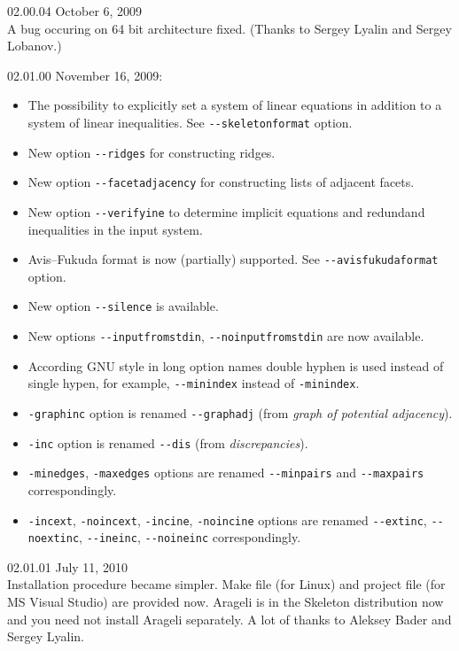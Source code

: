 \documentclass{article}
\newcommand{\Skeleton}{{\sc Skeleton}\xspace}
\newcommand{\params}{\smallskip\hangindent=2\parindent}
\newcommand{\Arageli}{{\sc Arageli}\xspace}
\begin{document}
\params \Skeleton 02.00.04 October 6, 2009\\
A bug occuring on 64 bit architecture fixed. (Thanks to Sergey Lyalin and Sergey Lobanov.)

\params \Skeleton 02.01.00 November 16, 2009:
\begin{itemize}
\item The possibility to explicitly set a system of linear equations in addition to a system of linear inequalities.
      See \verb$--skeletonformat$ option.
\item New option \verb$--ridges$ for constructing ridges.
\item New option \verb$--facetadjacency$ for constructing lists of adjacent facets.
\item New option \verb$--verifyine$ to determine implicit equations and redundand inequalities in the input system.
\item Avis--Fukuda format is now (partially) supported. See \verb$--avisfukudaformat$ option.
\item New option \verb$--silence$ is available.      
\item New options \verb$--inputfromstdin$, \verb$--noinputfromstdin$ are now available.
\item According GNU style in long option names double hyphen is used instead of single hypen, 
      for example, \verb$--minindex$ instead of \verb$-minindex$.
\item \verb$-graphinc$ option is renamed \verb$--graphadj$ (from {\it graph of potential adjacency}).
\item \verb$-inc$ option is renamed \verb$--dis$ (from {\it discrepancies}).
\item \verb$-minedges$, \verb$-maxedges$ options are renamed \verb$--minpairs$ and \verb$--maxpairs$
      correspondingly.
\item \verb$-incext$, \verb$-noincext$, \verb$-incine$, \verb$-noincine$ options are renamed 
      \verb$--extinc$, \verb$--noextinc$, \verb$--ineinc$, \verb$--noineinc$ correspondingly.
\end{itemize}

\params \Skeleton 02.01.01 July 11, 2010\\
      Installation procedure became simpler.
      Make file (for Linux) and project file (for MS Visual Studio) are provided now.
      \Arageli is in the \Skeleton distribution now and you need not install \Arageli separately.
      A lot of thanks to Aleksey Bader and Sergey Lyalin.
\end{document}
